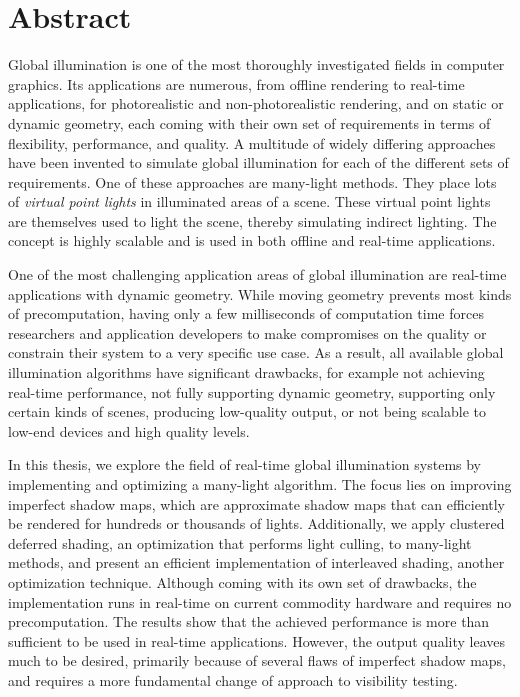 
\chapter*{Abstract}

Global illumination is one of the most thoroughly investigated fields in computer graphics. Its applications are numerous, from offline rendering to real-time applications, for photorealistic and non-photorealistic rendering, and on static or dynamic geometry, each coming with their own set of requirements in terms of flexibility, performance, and quality. A multitude of widely differing approaches have been invented to simulate global illumination for each of the different sets of requirements. One of these approaches are many-light methods. They place lots of \textit{virtual point lights} in illuminated areas of a scene. These virtual point lights are themselves used to light the scene, thereby simulating indirect lighting. The concept is highly scalable and is used in both offline and real-time applications.

One of the most challenging application areas of global illumination are real-time applications with dynamic geometry. While moving geometry prevents most kinds of precomputation, having only a few milliseconds of computation time forces researchers and application developers to make compromises on the quality or constrain their system to a very specific use case. As a result, all available global illumination algorithms have significant drawbacks, for example not achieving real-time performance, not fully supporting dynamic geometry, supporting only certain kinds of scenes, producing low-quality output, or not being scalable to low-end devices and high quality levels.

In this thesis, we explore the field of real-time global illumination systems by implementing and optimizing a many-light algorithm. The focus lies on improving imperfect shadow maps, which are approximate shadow maps that can efficiently be rendered for hundreds or thousands of lights. Additionally, we apply clustered deferred shading, an optimization that performs light culling, to many-light methods, and present an efficient implementation of interleaved shading, another optimization technique. Although coming with its own set of drawbacks, the implementation runs in real-time on current commodity hardware and requires no precomputation. The results show that the achieved performance is more than sufficient to be used in real-time applications. However, the output quality leaves much to be desired, primarily because of several flaws of imperfect shadow maps, and requires a more fundamental change of approach to visibility testing.


